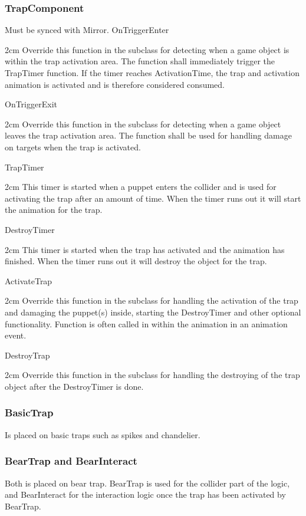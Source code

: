 \documentclass[11pt]{article}
\newenvironment{indentall}{\begin{adjustwidth}{2cm}{}}{\end{adjustwidth}}
\begin{document}
\newpage

\subsubsection{TrapComponent}
Must be synced with Mirror.
\newline
OnTriggerEnter
\begin{indentall}
Override this function in the subclass for detecting when a game object is within the trap activation area. The function shall immediately trigger the TrapTimer function. If the timer reaches ActivationTime, the trap and activation animation is activated and is therefore considered consumed.
\end{indentall}
OnTriggerExit
\begin{indentall}
Override this function in the subclass for detecting when a game object leaves the trap activation area. The function shall be used for handling damage on targets when the trap is activated.
\end{indentall}
TrapTimer
\begin{indentall}
This timer is started when a puppet enters the collider and is used for activating the trap after an amount of time. When the timer runs out it will start the animation for the trap.
\end{indentall}
DestroyTimer
\begin{indentall}
This timer is started when the trap has activated and the animation has finished. When the timer runs out it will destroy the object for the trap.
\end{indentall}
ActivateTrap
\begin{indentall}
Override this function in the subclass for handling the activation of the trap and damaging the puppet(s) inside, starting the DestroyTimer and other optional functionality. Function is often called in within the animation in an animation event.
\end{indentall}
DestroyTrap
\begin{indentall}
Override this function in the subclass for handling the destroying of the trap object after the DestroyTimer is done.
\end{indentall}

\subsubsection{BasicTrap}
Is placed on basic traps such as spikes and chandelier.

\subsubsection{BearTrap and BearInteract}
Both is placed on bear trap. BearTrap is used for the collider part of the logic, and BearInteract for the interaction logic once the trap has been activated by BearTrap.
\end{document}
